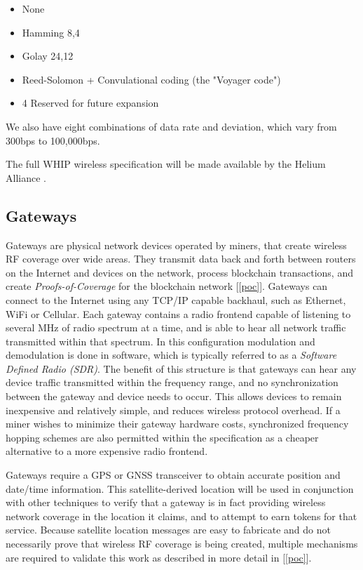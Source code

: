 \documentclass[letterpaper,11pt]{article}
\begin{document}
\begin{itemize}
	\item None
	\item Hamming 8,4
	\item Golay 24,12
	\item Reed-Solomon + Convulational coding (the "Voyager code")
	\item 4 Reserved for future expansion
\end{itemize}

We also have eight combinations of data rate and deviation, which vary from 300bps to 100,000bps.\newline

The full WHIP wireless specification will be made available by the Helium Alliance \cite{alliance}. 

\subsection{Gateways}

Gateways are physical network devices operated by miners, that create wireless RF coverage over wide areas. They transmit data back and forth between routers on the Internet and devices on the network, process blockchain transactions, and create \textit{Proofs-of-Coverage} for the blockchain network [\ref{poc}]. Gateways can connect to the Internet using any TCP/IP capable backhaul, such as Ethernet, WiFi or Cellular. Each gateway contains a radio frontend capable of listening to several MHz of radio spectrum at a time, and is able to hear all network traffic transmitted within that spectrum. In this configuration modulation and demodulation is done in software, which is typically referred to as a \textit{Software Defined Radio (SDR)}. The benefit of this structure is that gateways can hear any device traffic transmitted within the frequency range, and no synchronization between the gateway and device needs to occur. This allows devices to remain inexpensive and relatively simple, and reduces wireless protocol overhead. If a miner wishes to minimize their gateway hardware costs, synchronized frequency hopping schemes are also permitted within the specification as a cheaper alternative to a more expensive radio frontend.\newline

Gateways require a GPS or GNSS transceiver to obtain accurate position and date/time information. This satellite-derived location will be used in conjunction with other techniques to verify that a gateway is in fact providing wireless network coverage in the location it claims, and to attempt to earn tokens for that service. Because satellite location messages are easy to fabricate and do not necessarily prove that wireless RF coverage is being created, multiple mechanisms are required to validate this work as described in more detail in [\ref{poc}].\newline
\end{document}
